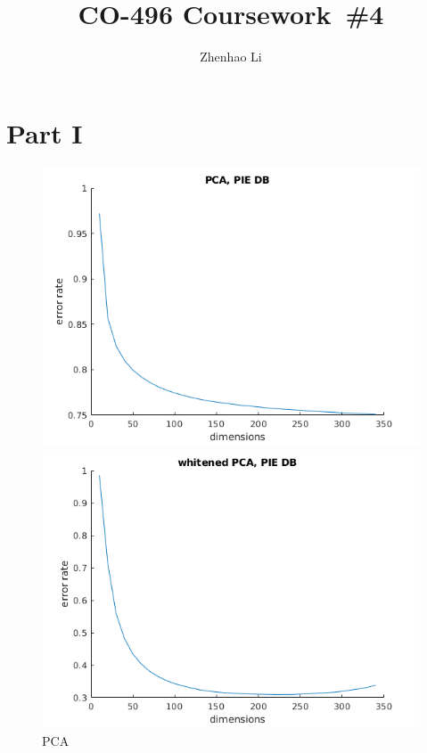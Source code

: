\documentclass[a4paper]{article}
\author{Zhenhao Li}
\title{\textbf{CO-496 Coursework\ \#4}}
\begin{document}
\maketitle

\section*{Part I}

\begin{figure}[htb]
   \begin{minipage}{0.33\textwidth}
     \centering
     \includegraphics[width=1\linewidth]{../pic/PCA.png}
     \caption{PCA}\label{Fig:PCA}
   \end{minipage}\hfill
   \begin{minipage}{0.33\textwidth}
     \centering
     \includegraphics[width=1\linewidth]{../pic/wPCA.png}

\end{minipage}
\end{figure}
\end{document}

